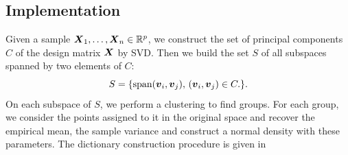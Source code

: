 \subsection{Implementation}

Given a sample $\boldsymbol X_1,\dots,\boldsymbol X_n\in{\mathbb R}^p$, we construct the set of principal components $C$ of the design matrix $\boldsymbol X$ by SVD. Then we build the set $S$ of all subspaces spanned by two elements of $C$:
\begin{equation}
  S = \{\textnormal{span}(\boldsymbol v_i,\boldsymbol v_j),\, (\boldsymbol v_i,\boldsymbol v_j) \in C.\}.
\end{equation}
On each subspace of $S$, we perform a clustering to find groups. For each group, we consider the points assigned to it in the original space and recover the empirical mean, the sample variance and construct a normal density with these parameters. The dictionary construction procedure is given in 

